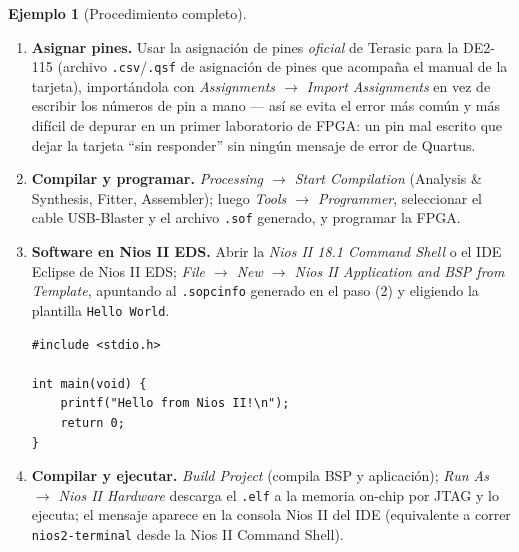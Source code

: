 \documentclass[11pt,letterpaper]{article}
\theoremstyle{definition}
\newtheorem{ejemplo}[definicion]{Ejemplo}
\begin{document}
\begin{ejemplo}[Procedimiento completo]
\begin{enumerate}[label=\textbf{(\arabic*)}, leftmargin=1.2cm]
\begin{lstlisting}[style=vstyle,caption={Instanciación del sistema generado en el top-level (Verilog)}]
endmodule
\end{lstlisting}
        El nombre exacto del módulo y de sus puertos (\texttt{clk\_clk}, \texttt{reset\_reset\_n})
        depende de cómo se hayan nombrado las interfaces exportadas en Platform Designer; Quartus
        muestra el nombre real generado en el panel \emph{IP Catalog $\to$ Instantiation Template}.
  \item \textbf{Asignar pines.} Usar la asignación de pines \emph{oficial} de Terasic para la
        DE2-115 (archivo \texttt{.csv}/\texttt{.qsf} de asignación de pines que acompaña el manual
        de la tarjeta), importándola con \emph{Assignments $\to$ Import Assignments} en vez de
        escribir los números de pin a mano --- así se evita el error más común y más difícil de
        depurar en un primer laboratorio de FPGA: un pin mal escrito que dejar la tarjeta
        ``sin responder'' sin ningún mensaje de error de Quartus.
  \item \textbf{Compilar y programar.} \emph{Processing $\to$ Start Compilation} (Analysis \&
        Synthesis, Fitter, Assembler); luego \emph{Tools $\to$ Programmer}, seleccionar el cable
        USB-Blaster y el archivo \texttt{.sof} generado, y programar la FPGA.
  \item \textbf{Software en Nios II EDS.} Abrir la \emph{Nios II 18.1 Command Shell} o el IDE
        Eclipse de Nios II EDS; \emph{File $\to$ New $\to$ Nios II Application and BSP from
        Template}, apuntando al \texttt{.sopcinfo} generado en el paso (2) y eligiendo la plantilla
        \texttt{Hello World}.
\begin{lstlisting}[caption={\texttt{hello\_world.c}, tal como lo genera la plantilla}]
#include <stdio.h>

int main(void) {
    printf("Hello from Nios II!\n");
    return 0;
}
\end{lstlisting}
  \item \textbf{Compilar y ejecutar.} \emph{Build Project} (compila BSP y aplicación); \emph{Run As
        $\to$ Nios II Hardware} descarga el \texttt{.elf} a la memoria on-chip por JTAG y lo
        ejecuta; el mensaje aparece en la consola Nios II del IDE (equivalente a correr
        \texttt{nios2-terminal} desde la Nios II Command Shell).
\end{enumerate}
\end{ejemplo}
\end{document}
